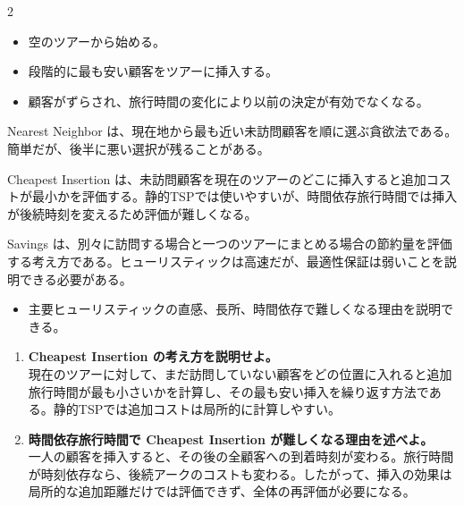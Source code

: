 \clearpage
{}
\begin{multicols}{2}\footnotesize\raggedcolumns
{}
\begin{itemize}
\item 空のツアーから始める。
\item 段階的に最も安い顧客をツアーに挿入する。
\item 顧客がずらされ、旅行時間の変化により以前の決定が有効でなくなる。
\end{itemize}
Nearest Neighbor は、現在地から最も近い未訪問顧客を順に選ぶ貪欲法である。簡単だが、後半に悪い選択が残ることがある。\par

Cheapest Insertion は、未訪問顧客を現在のツアーのどこに挿入すると追加コストが最小かを評価する。静的TSPでは使いやすいが、時間依存旅行時間では挿入が後続時刻を変えるため評価が難しくなる。\par

Savings は、別々に訪問する場合と一つのツアーにまとめる場合の節約量を評価する考え方である。ヒューリスティックは高速だが、最適性保証は弱いことを説明できる必要がある。\par
{}
\begin{itemize}
\item 主要ヒューリスティックの直感、長所、時間依存で難しくなる理由を説明できる。
\end{itemize}
\begin{enumerate}
\item \textbf{Cheapest Insertion の考え方を説明せよ。}\\現在のツアーに対して、まだ訪問していない顧客をどの位置に入れると追加旅行時間が最も小さいかを計算し、その最も安い挿入を繰り返す方法である。静的TSPでは追加コストは局所的に計算しやすい。
\item \textbf{時間依存旅行時間で Cheapest Insertion が難しくなる理由を述べよ。}\\一人の顧客を挿入すると、その後の全顧客への到着時刻が変わる。旅行時間が時刻依存なら、後続アークのコストも変わる。したがって、挿入の効果は局所的な追加距離だけでは評価できず、全体の再評価が必要になる。
\end{enumerate}
\end{multicols}

